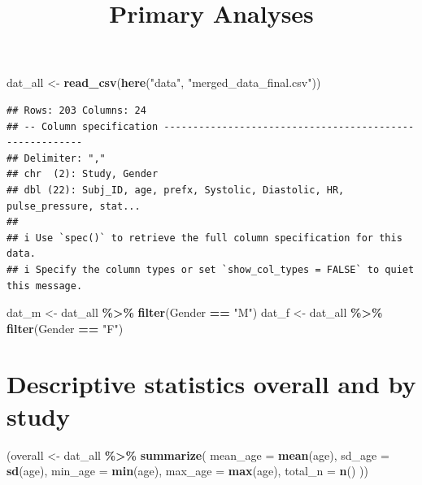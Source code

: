 \documentclass[
]{article}
\title{Primary Analyses}
\author{}
\date{\vspace{-2.5em}}
\newenvironment{Shaded}{\begin{snugshade}}{\end{snugshade}}
\newcommand{\AttributeTok}[1]{\textcolor[rgb]{0.13,0.29,0.53}{#1}}
\newcommand{\FunctionTok}[1]{\textcolor[rgb]{0.13,0.29,0.53}{\textbf{#1}}}
\newcommand{\NormalTok}[1]{#1}
\newcommand{\OtherTok}[1]{\textcolor[rgb]{0.56,0.35,0.01}{#1}}
\newcommand{\SpecialCharTok}[1]{\textcolor[rgb]{0.81,0.36,0.00}{\textbf{#1}}}
\newcommand{\StringTok}[1]{\textcolor[rgb]{0.31,0.60,0.02}{#1}}
\begin{document}
\maketitle

\begin{Shaded}
\begin{Highlighting}[]
\NormalTok{dat\_all }\OtherTok{\textless{}{-}} \FunctionTok{read\_csv}\NormalTok{(}\FunctionTok{here}\NormalTok{(}\StringTok{"data"}\NormalTok{, }\StringTok{"merged\_data\_final.csv"}\NormalTok{))}
\end{Highlighting}
\end{Shaded}

\begin{verbatim}
## Rows: 203 Columns: 24
## -- Column specification --------------------------------------------------------
## Delimiter: ","
## chr  (2): Study, Gender
## dbl (22): Subj_ID, age, prefx, Systolic, Diastolic, HR, pulse_pressure, stat...
## 
## i Use `spec()` to retrieve the full column specification for this data.
## i Specify the column types or set `show_col_types = FALSE` to quiet this message.
\end{verbatim}

\begin{Shaded}
\begin{Highlighting}[]
\NormalTok{dat\_m }\OtherTok{\textless{}{-}}\NormalTok{ dat\_all }\SpecialCharTok{\%\textgreater{}\%} \FunctionTok{filter}\NormalTok{(Gender }\SpecialCharTok{==} \StringTok{"M"}\NormalTok{)}
\NormalTok{dat\_f }\OtherTok{\textless{}{-}}\NormalTok{ dat\_all }\SpecialCharTok{\%\textgreater{}\%} \FunctionTok{filter}\NormalTok{(Gender }\SpecialCharTok{==} \StringTok{"F"}\NormalTok{)}
\end{Highlighting}
\end{Shaded}

\hypertarget{descriptive-statistics-overall-and-by-study}{%
\section{Descriptive statistics overall and by
study}\label{descriptive-statistics-overall-and-by-study}}

\begin{Shaded}
\begin{Highlighting}[]
\NormalTok{(overall }\OtherTok{\textless{}{-}}\NormalTok{ dat\_all }\SpecialCharTok{\%\textgreater{}\%}
  \FunctionTok{summarize}\NormalTok{(}
    \AttributeTok{mean\_age =} \FunctionTok{mean}\NormalTok{(age),}
    \AttributeTok{sd\_age =} \FunctionTok{sd}\NormalTok{(age),}
    \AttributeTok{min\_age =} \FunctionTok{min}\NormalTok{(age),}
    \AttributeTok{max\_age =} \FunctionTok{max}\NormalTok{(age),}
    \AttributeTok{total\_n =} \FunctionTok{n}\NormalTok{()}
\NormalTok{  ))}
\end{Highlighting}
\end{Shaded}
\end{document}
